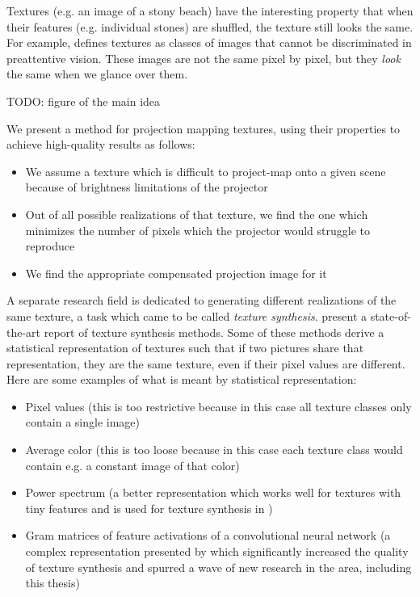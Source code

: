 Textures (e.g. an image of a stony beach) have the interesting property that when their features (e.g. individual stones) are shuffled, the texture still looks the same. For example, \citet*{Julesz1995} defines textures as classes of images that cannot be discriminated in preattentive vision. These images are not the same pixel by pixel, but they \textit{look} the same when we glance over them.

{\color{red} TODO: figure of the main idea}

We present a method for projection mapping textures, using their properties to achieve high-quality results as follows:

\begin{itemize}
    \item We assume a texture which is difficult to project-map onto a given scene because of brightness limitations of the projector
    \item Out of all possible realizations of that texture, we find the one which minimizes the number of pixels which the projector would struggle to reproduce
    \item We find the appropriate compensated projection image for it
\end{itemize}

A separate research field is dedicated to generating different realizations of the same texture, a task which came to be called \textit{texture synthesis}. \citet*{Raad2018} present a state-of-the-art report of texture synthesis methods. Some of these methods derive a statistical representation of textures such that if two pictures share that representation, they are the same texture, even if their pixel values are different. Here are some examples of what is meant by statistical representation:

\begin{itemize}
    \item Pixel values (this is too restrictive because in this case all texture classes only contain a single image)
    \item Average color (this is too loose because in this case each texture class would contain e.g. a constant image of that color)
    \item Power spectrum (a better representation which works well for textures with tiny features and is used for texture synthesis in \citet*{Galerne2011})
    \item Gram matrices of feature activations of a convolutional neural network (a complex representation presented by \citet*{Gatys2015} which significantly increased the quality of texture synthesis and spurred a wave of new research in the area, including this thesis)
\end{itemize}

